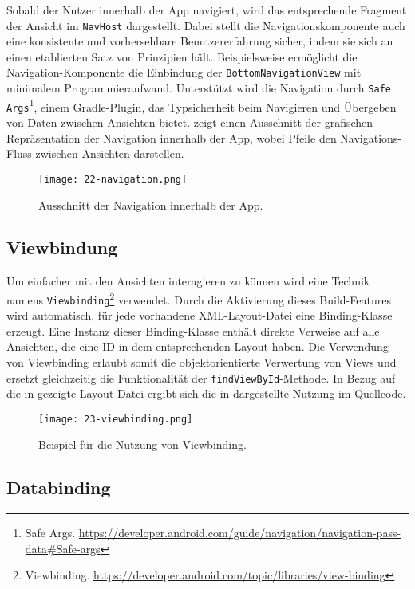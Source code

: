 Sobald der Nutzer innerhalb der App navigiert, wird das entsprechende Fragment der Ansicht im \texttt{NavHost} dargestellt. Dabei stellt die Navigationskomponente auch eine konsistente und vorhersehbare Benutzererfahrung sicher, indem sie sich an einen etablierten Satz von Prinzipien hält. Beispielsweise ermöglicht die Navigation-Komponente die Einbindung der \texttt{BottomNavigationView} mit minimalem Programmieraufwand. Unterstützt wird die Navigation durch \texttt{Safe Args}\footnote{Safe Args. \url{https://developer.android.com/guide/navigation/navigation-pass-data\#Safe-args}}, einem Gradle-Plugin, das Typsicherheit beim Navigieren und Übergeben von Daten zwischen Ansichten bietet.  zeigt einen Ausschnitt der grafischen Repräsentation der Navigation innerhalb der App, wobei Pfeile den Navigations-Fluss zwischen Ansichten darstellen.   

\begin{figure}[H]
  \texttt{[image: 22-navigation.png]}
  \caption{Ausschnitt der Navigation innerhalb der App.}\label{fig:navigation}
\end{figure}


\subsection{Viewbindung}\label{subsec:viewbinding}

Um einfacher mit den Ansichten interagieren zu können wird eine Technik namens \texttt{Viewbinding}\footnote{Viewbinding. \url{https://developer.android.com/topic/libraries/view-binding}} verwendet. Durch die Aktivierung dieses Build-Features wird automatisch, für jede vorhandene XML-Layout-Datei eine Binding-Klasse erzeugt. Eine Instanz dieser Binding-Klasse enthält direkte Verweise auf alle Ansichten, die eine ID in dem entsprechenden Layout haben. Die Verwendung von Viewbinding erlaubt somit die objektorientierte Verwertung von Views und ersetzt gleichzeitig die Funktionalität der \texttt{findViewById}-Methode. In Bezug auf die in  gezeigte Layout-Datei ergibt sich die in  dargestellte Nutzung im Quellcode.

\begin{figure}[H]
    \texttt{[image: 23-viewbinding.png]}
    \caption{Beispiel für die Nutzung von Viewbinding.}\label{fig:viewbinding}
\end{figure}

\subsection{Databinding}\label{subsec:databinding}


